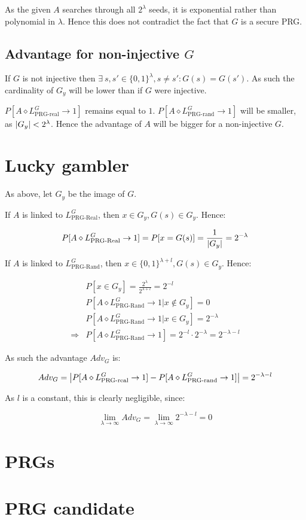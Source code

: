 \documentclass[a4paper]{scrreprt}
\DeclarePairedDelimiter\abs{\lvert}{\rvert}
\begin{document}
As the given $A$ searches through all $2^\lambda$ seeds, it is exponential
rather than polynomial in $\lambda$. Hence this does not contradict the fact
that $G$ is a secure PRG.

\subsection{Advantage for non-injective $G$}

If $G$ is not injective then $\exists\ s, s' \in \{0, 1\}^\lambda, s \neq s':
G(s) = G(s')$. As such the cardinality of $G_y$ will be lower than if $G$ were
injective.

$P[A \diamond L^G_{\text{PRG-real}} \rightarrow 1]$ remains equal to $1$. $P[A
\diamond L^G_{\text{PRG-rand}} \rightarrow 1]$ will be smaller, as $\abs{G_y} <
2^\lambda$. Hence the advantage of $A$ will be bigger for a non-injective $G$.

\section{Lucky gambler}

As above, let $G_y$ be the image of $G$.

If $A$ is linked to $L^G_{\text{PRG-Real}}$, then $x \in G_y, G(s) \in G_y$. Hence:

\[
	P[A \diamond L^G_{\text{PRG-Real}} \rightarrow 1] = P[x = G(s)] = \frac{1}{\abs{G_y}} = 2^{-\lambda}
\]

If $A$ is linked to $L^G_{\text{PRG-Rand}}$, then $x \in \{0, 1\}^{\lambda + l}, G(s) \in G_y$. Hence:

\begin{align*}
	& P[x \in G_y] = \frac{2^\lambda}{2^{\lambda + l}} = 2^{-l} \\
	& P[A \diamond L^G_{\text{PRG-Rand}} \rightarrow 1 | x \not \in G_y] = 0 \\
	& P[A \diamond L^G_{\text{PRG-Rand}} \rightarrow 1 | x \in G_y] = 2^{-\lambda} \\
	\Rightarrow & P[A \diamond L^G_{\text{PRG-Rand}} \rightarrow 1] = 2^{-l} \cdot 2^{-\lambda} = 2^{-\lambda - l}
\end{align*}

As such the advantage $Adv_G$ is:

\[
	Adv_G = \abs*{P[A \diamond L^G_{\text{PRG-real}} \rightarrow 1] - P[A \diamond L^G_{\text{PRG-rand}} \rightarrow 1]} = 2^{-\lambda - l}
\]

As $l$ is a constant, this is clearly negligible, since:

\[
	\lim_{\lambda \rightarrow \infty}{Adv_G} = \lim_{\lambda \rightarrow \infty}{2^{-\lambda -l}} = 0
\]


\section{PRGs}


\section{PRG candidate}
\end{document}
